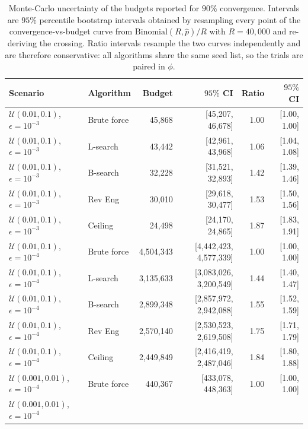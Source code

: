 \begin{table}[ht]
\centering
\scriptsize
\caption{Monte-Carlo uncertainty of the budgets reported for $90\%$ convergence. Intervals are $95\%$ percentile bootstrap intervals obtained by resampling every point of the convergence-vs-budget curve from $\mathrm{Binomial}(R,\hat p)/R$ with $R=40{,}000$ and re-deriving the crossing. Ratio intervals resample the two curves independently and are therefore conservative: all algorithms share the same seed list, so the trials are paired in $\phi$.}
\label{tab:uncertainty}
\begin{tabular}{llrrrr}
\toprule
Scenario
& Algorithm
& Budget
& $95\%$ CI
& Ratio
& $95\%$ CI \\
\midrule
$\mathcal{U}(0.01,0.1)$, $\epsilon=10^{-3}$
& Brute force
& 45{,}868
& {[45{,}207, 46{,}678]}
& 1.00
& {[1.00, 1.00]} \\
$\mathcal{U}(0.01,0.1)$, $\epsilon=10^{-3}$
& L-search
& 43{,}442
& {[42{,}961, 43{,}968]}
& 1.06
& {[1.04, 1.08]} \\
$\mathcal{U}(0.01,0.1)$, $\epsilon=10^{-3}$
& B-search
& 32{,}228
& {[31{,}521, 32{,}893]}
& 1.42
& {[1.39, 1.46]} \\
$\mathcal{U}(0.01,0.1)$, $\epsilon=10^{-3}$
& Rev Eng
& 30{,}010
& {[29{,}618, 30{,}477]}
& 1.53
& {[1.50, 1.56]} \\
$\mathcal{U}(0.01,0.1)$, $\epsilon=10^{-3}$
& Ceiling
& 24{,}498
& {[24{,}170, 24{,}865]}
& 1.87
& {[1.83, 1.91]} \\
$\mathcal{U}(0.01,0.1)$, $\epsilon=10^{-4}$
& Brute force
& 4{,}504{,}343
& {[4{,}442{,}423, 4{,}577{,}339]}
& 1.00
& {[1.00, 1.00]} \\
$\mathcal{U}(0.01,0.1)$, $\epsilon=10^{-4}$
& L-search
& 3{,}135{,}633
& {[3{,}083{,}026, 3{,}200{,}549]}
& 1.44
& {[1.40, 1.47]} \\
$\mathcal{U}(0.01,0.1)$, $\epsilon=10^{-4}$
& B-search
& 2{,}899{,}348
& {[2{,}857{,}972, 2{,}942{,}088]}
& 1.55
& {[1.52, 1.59]} \\
$\mathcal{U}(0.01,0.1)$, $\epsilon=10^{-4}$
& Rev Eng
& 2{,}570{,}140
& {[2{,}530{,}523, 2{,}619{,}508]}
& 1.75
& {[1.71, 1.79]} \\
$\mathcal{U}(0.01,0.1)$, $\epsilon=10^{-4}$
& Ceiling
& 2{,}449{,}849
& {[2{,}416{,}419, 2{,}487{,}046]}
& 1.84
& {[1.80, 1.88]} \\
$\mathcal{U}(0.001,0.01)$, $\epsilon=10^{-4}$
& Brute force
& 440{,}367
& {[433{,}078, 448{,}363]}
& 1.00
& {[1.00, 1.00]} \\
$\mathcal{U}(0.001,0.01)$, $\epsilon=10^{-4}$

\end{tabular}
\end{table}
